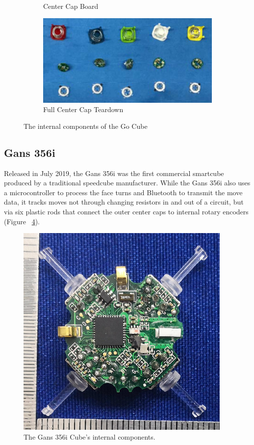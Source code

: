 \begin{figure}[h]
\begin{subfigure}{0.25\textwidth}
        \caption{Center Cap Board}
        \label{fig:gocube-cap-chip}
    \end{subfigure}%
    \begin{subfigure}{0.50\textwidth}
        \centering
        \includegraphics[width=.90\linewidth]{Figures/3 State of the Art/gocube-centers.png}
        \caption{Full Center Cap Teardown}
        \label{fig:gocube-centers}
    \end{subfigure}%
    \caption{The internal components of the Go Cube \cite{gocube-internals}}
    \label{fig:gocube-internal-components}
\end{figure}

\subsection{Gans 356i}
Released in July 2019, the Gans 356i was the first commercial smartcube produced by a traditional speedcube manufacturer. \cite{gans356i-thecubicle}
While the Gans 356i also uses a microcontroller to process the face turns and Bluetooth to transmit the move data, it tracks moves not through changing resistors in and out of a circuit, but via six plastic rods that connect the outer center caps to internal rotary encoders (Figure ~\ref{fig:gans356i-core}).

\begin{figure}[h]
    \centering
    \includegraphics{Figures/3 State of the Art/gans356i-core.png}
    \decoRule
    \caption[Gans 356i Teardown]{The Gans 356i Cube's internal components. \cite{gans-356i-internals}}
    \label{fig:gans356i-core}
\end{figure}



